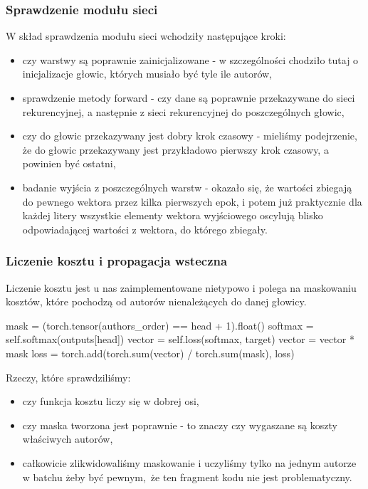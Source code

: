 \subsubsection{Sprawdzenie modułu sieci}
W skład sprawdzenia modułu sieci wchodziły następujące kroki:
	\begin{itemize} 
	  \item {czy warstwy są poprawnie zainicjalizowane - w szczególności chodziło tutaj o inicjalizacje głowic, 
	  których musiało być tyle ile autorów,}
	  \item {sprawdzenie metody forward - czy dane są poprawnie przekazywane do sieci rekurencyjnej, a następnie 
	  z sieci rekurencyjnej do poszczególnych głowic,}
	  \item {czy do głowic przekazywany jest dobry krok czasowy - mieliśmy podejrzenie, że do głowic przekazywany jest przykładowo
	  pierwszy krok czasowy, a powinien być ostatni,}
	  \item {badanie wyjścia z poszczególnych warstw - okazało się, że wartości zbiegają do pewnego wektora przez kilka pierwszych epok,
	  i potem już praktycznie dla każdej litery wszystkie elementy wektora wyjściowego oscylują blisko odpowiadającej wartości z  wektora,
	  do którego zbiegały.} 
	\end{itemize}

\subsubsection{Liczenie kosztu i propagacja wsteczna}
Liczenie kosztu jest u nas zaimplementowane nietypowo i polega na maskowaniu kosztów, które pochodzą od autorów
nienależących do danej głowicy. 
\begin{python}
mask = (torch.tensor(authors_order) == head + 1).float()
softmax = self.softmax(outputs[head])
vector = self.loss(softmax, target)
vector = vector * mask
loss = torch.add(torch.sum(vector) / torch.sum(mask), loss)
    
\end{python} 
Rzeczy, które sprawdziliśmy: 
\begin{itemize}
	  \item {czy funkcja kosztu liczy się w dobrej osi,}
	  \item {czy maska tworzona jest poprawnie - to znaczy czy wygaszane są koszty właściwych autorów,}
	  \item {całkowicie zlikwidowaliśmy maskowanie i uczyliśmy tylko na jednym autorze w batchu żeby być pewnym, że ten fragment
	  kodu nie jest problematyczny.}
\end{itemize}

